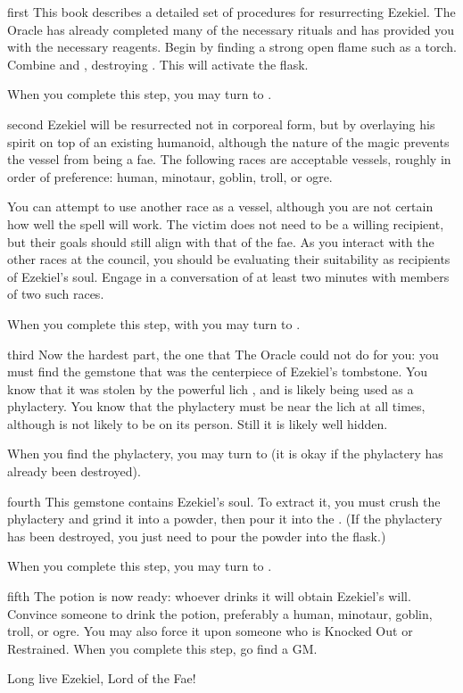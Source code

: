 \documentclass[notebook]{guildcamp2} %
\begin{document}
\startnotebook{\nEzekiel{}}

\begin{page}{first}
This book describes a detailed set of procedures for resurrecting Ezekiel. The Oracle has already completed many of the necessary rituals and 
has provided you with the necessary reagents. Begin by finding a strong open flame such as a torch. Combine \iFlask{} and \iQuintu{}, destroying
\iQuintu{}. This will activate the flask.

When you complete this step, you may turn to .
\end{page}

\begin{page}{second}
Ezekiel will be resurrected not in corporeal form, but by overlaying his spirit on top of an existing humanoid, although the nature of the magic
prevents the vessel from being a fae. The following races are acceptable vessels, roughly in order of preference: human, minotaur, goblin, troll, or ogre.

You can attempt to use another race as a vessel, although you are not certain how well the spell will work. The victim does not need to be a willing recipient, but their goals should still align with that of the fae.
As you interact with the other races at the council, you should be evaluating their suitability as recipients of Ezekiel's soul. Engage in a conversation of at least two minutes with members of two such races.

When you complete this step, with you may turn to .
\end{page}

\begin{page}{third}
Now the hardest part, the one that The Oracle could not do for you: you must find the gemstone that was the centerpiece of Ezekiel's tombstone.
You know that it was stolen by the powerful lich \cLich{}, and is likely being used as a phylactery. You know that the phylactery must be near
the lich at all times, although is not likely to be on its person. Still it is likely well hidden.

When you find the phylactery, you may turn to  (it is okay if the phylactery has already been destroyed).
\end{page}


\begin{page}{fourth}
This gemstone contains Ezekiel's soul. To extract it, you must crush the phylactery and grind it into a powder, then pour it into the \iFlask{}. (If the phylactery has been destroyed, you just need to pour the powder into the flask.)

When you complete this step, you may turn to .
\end{page}

\begin{page}{fifth}
The potion is now ready: whoever drinks it will obtain Ezekiel's will. Convince someone to drink the potion, preferably a human, minotaur, goblin, troll, or ogre. You may also force it upon someone who is Knocked Out or Restrained. When you complete this step, go find a GM.

Long live Ezekiel, Lord of the Fae!
\end{page}

\endnotebook
\end{document}
